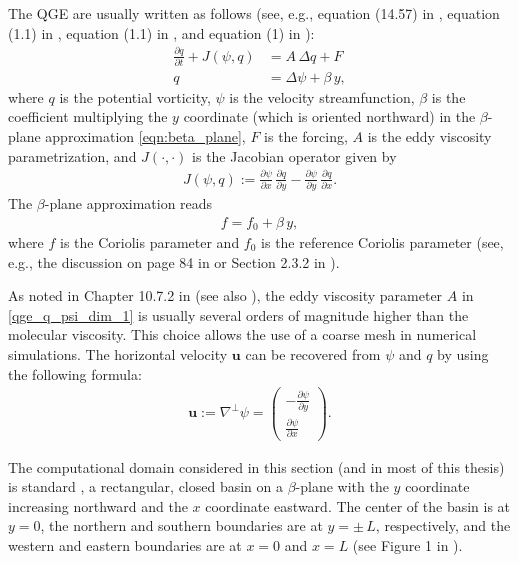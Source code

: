 The QGE are usually written as follows (see, e.g., equation (14.57) in
\cite{Vallis06}, equation (1.1) in \cite{Majda}, equation (1.1) in
\cite{Wang94}, and equation (1) in \cite{Greatbatch00}):
\begin{align}
  \frac{\partial q}{\partial t} + J(\psi , q) &= A \, \Delta q + F
    \label{qge_q_psi_dim_1} \\
  q &= \Delta \psi + \beta \, y , \label{qge_q_psi_dim_2}
\end{align}
where $q$ is the potential vorticity, $\psi$ is the velocity streamfunction,
$\beta$ is the coefficient multiplying the $y$ coordinate (which is oriented
northward) in the $\beta$-plane approximation \eqref{eqn:beta_plane}, $F$ is the
forcing, $A$ is the eddy viscosity parametrization, and $J(\cdot , \cdot)$ is
the Jacobian operator given by
\begin{align}
  J(\psi , q) := \frac{\partial \psi}{\partial x} \, \frac{\partial q}{\partial y} -
    \frac{\partial \psi}{\partial y} \, \frac{\partial q}{\partial x} . \label{eqn:jacobian}
\end{align}
The $\beta$-plane approximation reads
\begin{align}
  f = f_0 + \beta \, y , \label{eqn:beta_plane}
\end{align}
where $f$ is the Coriolis parameter and $f_0$ is the reference Coriolis
parameter (see, e.g., the discussion on page 84 in \cite{Cushman94} or Section
2.3.2 in \cite{Vallis06}).

As noted in Chapter 10.7.2 in \cite{Vallis06} (see also \cite{San12}), the eddy
viscosity parameter $A$ in \eqref{qge_q_psi_dim_1} is usually several orders of
magnitude higher than the molecular viscosity. This choice allows the use of a
coarse mesh in numerical simulations. The horizontal velocity $\mathbf{u}$ can
be recovered from $\psi$ and $q$ by using the following formula:
\begin{align}
  \mathbf{u} := \nabla^{\perp} \psi =
    \begin{pmatrix} - \frac{\partial \psi}{\partial y} \\
    \frac{\partial \psi}{\partial x}
  \end{pmatrix} .
\label{eqn:u_psi}
\end{align}

The computational domain considered in this section (and in most of this thesis)
is standard \cite{Greatbatch00}, a rectangular, closed basin on a $\beta$-plane
with the $y$ coordinate increasing northward and the $x$ coordinate eastward.
The center of the basin is at $y=0$, the northern and southern boundaries are at
$y = \pm \, L$, respectively, and the western and eastern boundaries are at $x =
0$ and $x = L$ (see Figure 1 in \cite{Greatbatch00}).

